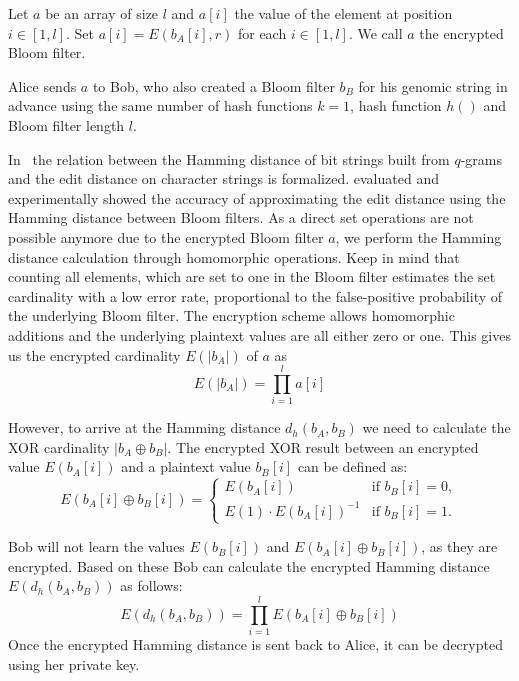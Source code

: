 \documentclass{llncs}
\begin{document}
Let $a$ be an array of size $l$ and $a[i]$ the value of the element at position $i \in [1,l]$.
Set $a[i] = E(b_A[i], r)$ for each $i \in [1,l]$.
We call $a$ the encrypted Bloom filter. 

Alice sends $a$ to Bob, who also created a Bloom filter $b_B$ for his genomic string in advance using the same number of hash functions $k = 1$, hash function $h()$ and Bloom filter length $l$. 


In~\cite{Li07} the relation between the Hamming distance of bit strings built from $q$-grams and the edit distance on character strings is formalized.
\cite{BecKer12} evaluated and experimentally showed the accuracy of approximating the edit distance using the Hamming distance between Bloom filters.
As a direct set operations are not possible anymore due to the encrypted Bloom filter $a$, we perform the Hamming distance calculation through homomorphic operations.
Keep in mind that counting all elements, which are set to one in the Bloom filter estimates the set cardinality with a low error rate, proportional to the false-positive probability of the underlying Bloom filter.
The encryption scheme allows homomorphic additions and the underlying plaintext values are all either zero or one.
This gives us the encrypted cardinality $E(|b_A|)$ of $a$ as
$$
E(|b_A|) = \prod_{i=1}^{l}a[i]
$$

However, to arrive at the Hamming distance $d_h(b_A, b_B)$ we need to calculate the XOR cardinality $|b_A \oplus b_B|$.
The encrypted XOR result between an encrypted value $E(b_A[i])$ and a plaintext value $b_B[i]$ can be defined as:
$$
E(b_A[i] \oplus b_B[i])=\begin{cases}
E(b_A[i])& \text{if $b_B[i] = 0$},\\
E(1) \cdot E(b_A[i])^{-1}& \text{if $b_B[i] = 1$}.
\end{cases}
$$



Bob will not learn the values $E(b_B[i])$ and $E(b_A[i] \oplus b_B[i])$, as they are encrypted.
Based on these Bob can calculate the encrypted Hamming distance $E(d_h(b_A,b_B))$ as follows:
$$
E(d_h(b_A,b_B)) = \prod_{i=1}^{l}E(b_A[i] \oplus b_B[i])
$$
Once the encrypted Hamming distance is sent back to Alice, it can be decrypted using her private key.
\end{document}
